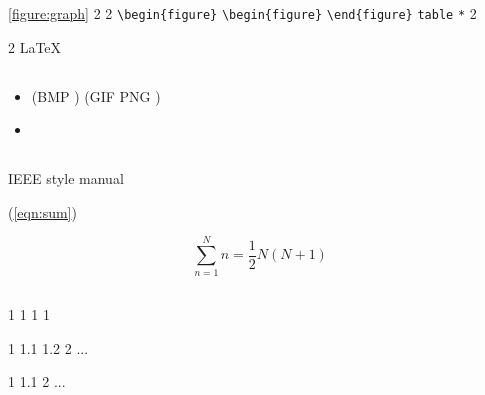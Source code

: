 \documentclass{article}
\begin{document}
 \ref{figure:graph} 2 2 
 \verb|\begin{figure}| \verb|\begin{figure}| 
\verb|\end{figure}| \verb|table| 
 \verb|*| 2 

 2 \LaTeX  
 

\subsection{ }
 

 

\subsection{ }
 
 
\begin{itemize}

 \item  
        
        (BMP ) (GIF PNG )  

 \item  
        
        
\end{itemize}

\subsection{ }
 IEEE style manual\cite{IEEE2014} 

 (\ref{eqn:sum}) 

\begin{equation}
\sum^{N}_{n=1}n = \frac{1}{2}N(N+1)
\label{eqn:sum}
\end{equation}

\subsection{ }
1 1 1 1 

 1 1.1 1.2 2 ...

 1 1.1 2 ...

\section{ }
 


\section{ }
\end{document}
